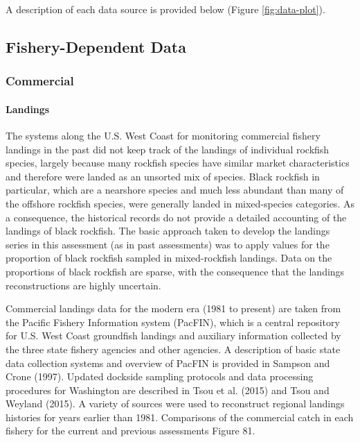 \documentclass[11pt,
  english,
  letterpaper,
]{article}
\begin{document}
A description of each data source is provided below (Figure \ref{fig:data-plot}).

\hypertarget{fishery-dependent-data}{%
\subsection{Fishery-Dependent Data}\label{fishery-dependent-data}}

\hypertarget{commercial}{%
\subsubsection{Commercial}\label{commercial}}

\hypertarget{landings}{%
\paragraph{Landings}\label{landings}}

The systems along the U.S. West Coast for monitoring commercial fishery landings in the past did not keep track of the landings of individual rockfish species, largely because many rockfish species have similar market characteristics and therefore were landed as an unsorted mix of species. Black rockfish in particular, which are a nearshore species and much less abundant than many of the offshore rockfish species, were generally landed in mixed-species categories. As a consequence, the historical records do not provide a detailed accounting of the landings of black rockfish. The basic approach taken to develop the landings series in this assessment (as in past assessments) was to apply values for the proportion of black rockfish sampled in mixed-rockfish landings. Data on the proportions of black rockfish are sparse, with the consequence that the landings reconstructions are highly uncertain.

Commercial landings data for the modern era (1981 to present) are taken from the Pacific Fishery Information system (PacFIN), which is a central repository for U.S. West Coast groundfish landings and auxiliary information collected by the three state fishery agencies and other agencies. A description of basic state data collection systems and overview of PacFIN is provided in Sampson and Crone (1997). Updated dockside sampling protocols and data processing procedures for Washington are described in Tsou et al. (2015) and Tsou and Weyland (2015). A variety of sources were used to reconstruct regional landings histories for years earlier than 1981. Comparisons of the commercial catch in each fishery for the current and previous assessments Figure 81.
\end{document}
